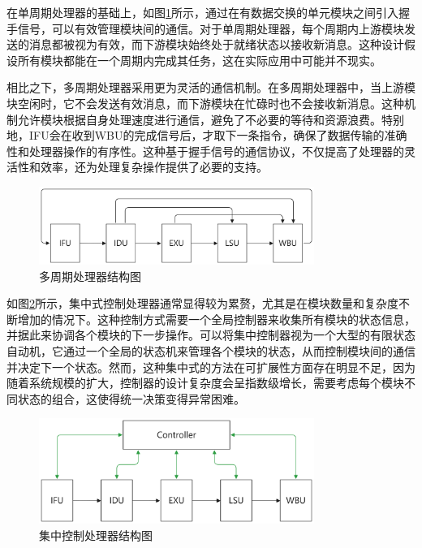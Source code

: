 在单周期处理器的基础上，如图\ref{fig:multicycle_cpu}所示，通过在有数据交换的单元模块之间引入握手信号，可以有效管理模块间的通信。对于单周期处理器，每个周期内上游模块发送的消息都被视为有效，而下游模块始终处于就绪状态以接收新消息。这种设计假设所有模块都能在一个周期内完成其任务，这在实际应用中可能并不现实。

相比之下，多周期处理器采用更为灵活的通信机制。在多周期处理器中，当上游模块空闲时，它不会发送有效消息，而下游模块在忙碌时也不会接收新消息。这种机制允许模块根据自身处理速度进行通信，避免了不必要的等待和资源浪费。特别地，IFU会在收到WBU的完成信号后，才取下一条指令，确保了数据传输的准确性和处理器操作的有序性。这种基于握手信号的通信协议，不仅提高了处理器的灵活性和效率，还为处理复杂操作提供了必要的支持。

\begin{figure}[htbp]
	\centering
	\includegraphics[width=0.8\textwidth]{image/multicycle_cpu.pdf}
	\caption{多周期处理器结构图}
	\label{fig:multicycle_cpu}
\end{figure}

如图\ref{fig:centralized_controller}所示，集中式控制处理器通常显得较为累赘，尤其是在模块数量和复杂度不断增加的情况下。这种控制方式需要一个全局控制器来收集所有模块的状态信息，并据此来协调各个模块的下一步操作。可以将集中控制器视为一个大型的有限状态自动机，它通过一个全局的状态机来管理各个模块的状态，从而控制模块间的通信并决定下一个状态。然而，这种集中式的方法在可扩展性方面存在明显不足，因为随着系统规模的扩大，控制器的设计复杂度会呈指数级增长，需要考虑每个模块不同状态的组合，这使得统一决策变得异常困难。

\begin{figure}[htbp]
	\centering
	\includegraphics[width=0.8\textwidth]{image/centralized_controller.pdf}
	\caption{集中控制处理器结构图}
	\label{fig:centralized_controller}
\end{figure}


